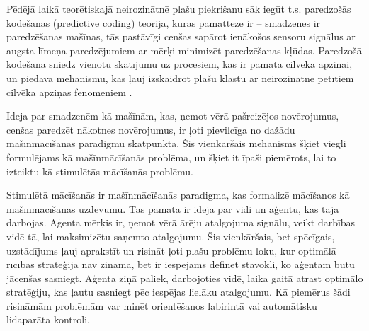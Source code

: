 \documentclass{ludis} %
\begin{document}
\tableofcontents

Pēdējā laikā teorētiskajā neirozinātnē plašu piekrišanu sāk iegūt t.s.
paredzošās kodēšanas (predictive coding) teorija, kuras pamattēze ir --
smadzenes ir paredzēšanas mašīnas, tās pastāvīgi cenšas sapārot ienākošos
sensoru signālus ar augsta līmeņa paredzējumiem ar mērķi minimizēt paredzēšanas
kļūdas. Paredzošā kodēšana sniedz vienotu skatījumu uz procesiem, kas ir pamatā
cilvēka apziņai, un piedāvā mehānismu, kas ļauj izskaidrot plašu klāstu ar
neirozinātnē pētītiem cilvēka apziņas fenomeniem \autocite{Clark2013}.

Ideja par smadzenēm kā mašīnām, kas, ņemot vērā pašreizējos novērojumus, cenšas
paredzēt nākotnes novērojumus, ir ļoti pievilcīga no dažādu mašīnmācīšanās
paradigmu skatpunkta. Šis vienkāršais mehānisms šķiet viegli formulējams kā
mašīnmācīšanās problēma, un šķiet it īpaši piemērots, lai to izteiktu kā
stimulētās mācīšanās problēmu.

Stimulētā mācīšanās ir mašīnmācīšanās paradigma, kas formalizē mācīšanos kā
mašīnmācīšanās uzdevumu. Tās pamatā ir ideja par vidi un aģentu, kas tajā
darbojas. Aģenta mērķis ir, ņemot vērā ārēju atalgojuma signālu, veikt darbības
vidē tā, lai maksimizētu saņemto atalgojumu. Šis vienkāršais, bet spēcīgais,
uzstādījums ļauj aprakstīt un risināt ļoti plašu problēmu loku, kur optimālā
rīcības stratēģija nav zināma, bet ir iespējams definēt stāvokli, ko aģentam
būtu jācenšas sasniegt. Aģenta ziņā paliek, darbojoties vidē, laika gaitā atrast
optimālo stratēģiju, kas ļautu sasniegt pēc iespējas lielāku atalgojumu. Kā
piemērus šādi risināmām problēmām var minēt orientēšanos labirintā vai
automātisku lidaparāta kontroli.
\end{document}
